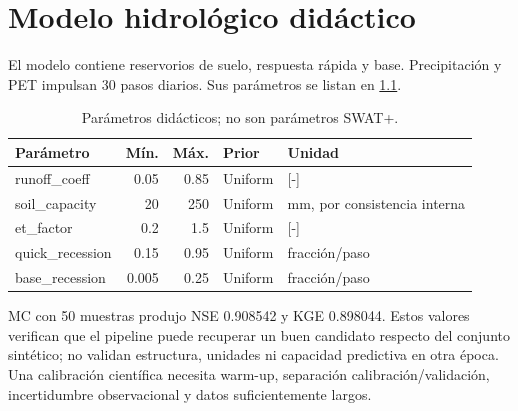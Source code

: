 \chapter{Modelo hidrológico didáctico}
El modelo contiene reservorios de suelo, respuesta rápida y base. Precipitación y PET impulsan 30 pasos diarios. Sus parámetros se listan en \cref{tab:parameters}.
\begin{table}[htbp]\centering\small\caption{Parámetros didácticos; no son parámetros SWAT+.}\label{tab:parameters}
\begin{tabular}{lrrll}\toprule Parámetro & Mín. & Máx. & Prior & Unidad\\\midrule
runoff\_coeff & 0.05&0.85&Uniform&[-]\\ soil\_capacity&20&250&Uniform&mm, por consistencia interna\\ et\_factor&0.2&1.5&Uniform&[-]\\ quick\_recession&0.15&0.95&Uniform&fracción/paso\\ base\_recession&0.005&0.25&Uniform&fracción/paso\\\bottomrule
\end{tabular}\end{table}

MC con 50 muestras produjo NSE 0.908542 y KGE 0.898044. Estos valores verifican que el pipeline puede recuperar un buen candidato respecto del conjunto sintético; no validan estructura, unidades ni capacidad predictiva en otra época. Una calibración científica necesita warm-up, separación calibración/validación, incertidumbre observacional y datos suficientemente largos.

